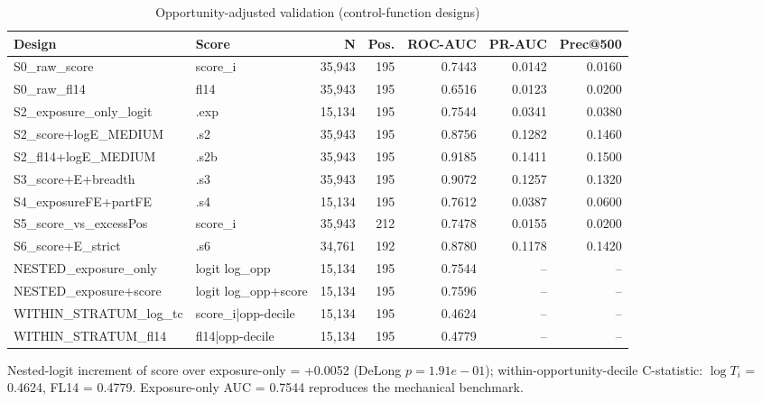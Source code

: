 \begin{table}[htbp]\centering
\caption{Opportunity-adjusted validation (control-function designs)}
\label{tab:opp_adjusted_validation}
\begin{tabular}{llrrrrr}\hline
Design & Score & N & Pos. & ROC-AUC & PR-AUC & Prec@500 \\\hline
S0\_raw\_score & score\_i & 35,943 & 195 & 0.7443 & 0.0142 & 0.0160 \\
S0\_raw\_fl14 & fl14 & 35,943 & 195 & 0.6516 & 0.0123 & 0.0200 \\
S2\_exposure\_only\_logit & .exp & 15,134 & 195 & 0.7544 & 0.0341 & 0.0380 \\
S2\_score+logE\_MEDIUM & .s2 & 35,943 & 195 & 0.8756 & 0.1282 & 0.1460 \\
S2\_fl14+logE\_MEDIUM & .s2b & 35,943 & 195 & 0.9185 & 0.1411 & 0.1500 \\
S3\_score+E+breadth & .s3 & 35,943 & 195 & 0.9072 & 0.1257 & 0.1320 \\
S4\_exposureFE+partFE & .s4 & 15,134 & 195 & 0.7612 & 0.0387 & 0.0600 \\
S5\_score\_vs\_excessPos & score\_i & 35,943 & 212 & 0.7478 & 0.0155 & 0.0200 \\
S6\_score+E\_strict & .s6 & 34,761 & 192 & 0.8780 & 0.1178 & 0.1420 \\
NESTED\_exposure\_only & logit log\_opp & 15,134 & 195 & 0.7544 & -- & -- \\
NESTED\_exposure+score & logit log\_opp+score & 15,134 & 195 & 0.7596 & -- & -- \\
WITHIN\_STRATUM\_log\_tc & score\_i|opp-decile & 15,134 & 195 & 0.4624 & -- & -- \\
WITHIN\_STRATUM\_fl14 & fl14|opp-decile & 15,134 & 195 & 0.4779 & -- & -- \\
\hline\end{tabular}
\begin{tablenotes}\footnotesize\item Nested-logit increment of score over exposure-only = +0.0052 (DeLong $p=1.91e-01$); within-opportunity-decile C-statistic: $\log T_i$ = 0.4624, FL14 = 0.4779. Exposure-only AUC = 0.7544 reproduces the mechanical benchmark.\end{tablenotes}
\end{table}
